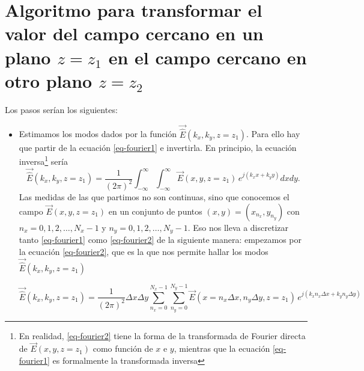 \documentclass[twocolumn,tikz]{handout}
\begin{document}
\section{Algoritmo para transformar el valor del campo cercano en un
plano $z=z_{1}$ en el campo cercano en otro plano $z=z_{2}$}

Los pasos serían los siguientes:
\begin{itemize}
\item Estimamos los modos dados por la función
$\vec{\hat{E}}(k_{x},k_{y},z=z_{1})$. Para ello hay que partir de la
ecuación \eqref{eq-fourier1} e invertirla. En principio, la ecuación
inversa\footnote{En realidad, \eqref{eq-fourier2} tiene la forma de
la transformada de Fourier directa de $\vec{E}(x,y,z=z_{1})$ como
función de $x$ e $y$, mientras que la ecuación \eqref{eq-fourier1}
es formalmente la transformada inversa} sería
\begin{equation}
\vec{\hat{E}}(k_{x},k_{y},z=z_{1})=\frac{1}{(2\pi)^{2}}\int_{-\infty}^{\infty}\int_{-\infty}^{\infty}\vec{E}(x,y,z=z_{1})
\,e^{j (k_{x} x+k_{y} y)} dx dy.
\label{eq-fourier2}
\end{equation}
Las medidas de las que partimos no son continuas, sino que conocemos
el campo $\vec{E}(x,y,z=z_{1})$ en un conjunto de puntos
$(x,y)=(x_{n_{x}},y_{n_{y}})$ con $n_{x}=0,1,2,\ldots,N_{x}-1$ y
$n_{y}=0,1,2,\ldots,N_{y}-1$. Eso nos lleva a discretizar tanto
\eqref{eq-fourier1} como \eqref{eq-fourier2} de la siguiente manera:
empezamos por la ecuación \eqref{eq-fourier2}, que es la que nos
permite hallar los modos $\vec{\hat{E}}(k_{x},k_{y},z=z_{1})$

\begin{equation}
\vec{\hat{E}}(k_{x},k_{y},z=z_{1})=\frac{1}{(2\pi)^{2}}\Delta x
\Delta y
\sum_{n_{x}=0}^{N_{x}-1}\sum_{n_{y}=0}^{N_{y}-1}\vec{E}(x=n_{x}\Delta
x,n_{y} \Delta y,z=z_{1}) \,e^{j (k_{x} n_{x} \Delta x+k_{y} n_{y}
\Delta y)}
\label{eq-fourier3}
\end{equation}


\end{itemize}
\end{document}
